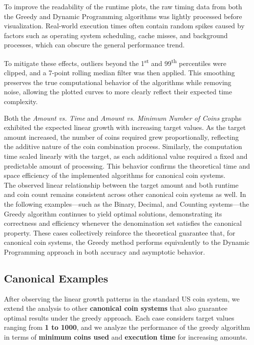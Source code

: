 \documentclass[12pt,a4paper]{report}
\begin{document}
\begin{tcolorbox}[colback=gray!5!white, colframe=black, title=Note on Data Smoothing and Filtering]
To improve the readability of the runtime plots, the raw timing data from both the Greedy and Dynamic Programming algorithms was lightly processed before visualization. Real-world execution times often contain random spikes caused by factors such as operating system scheduling, cache misses, and background processes, which can obscure the general performance trend.  

To mitigate these effects, outliers beyond the 1\textsuperscript{st} and 99\textsuperscript{th} percentiles were clipped, and a 7-point rolling median filter was then applied. This smoothing preserves the true computational behavior of the algorithms while removing noise, allowing the plotted curves to more clearly reflect their expected time complexity.
\end{tcolorbox}

Both the \textit{Amount vs. Time} and \textit{Amount vs. Minimum Number of Coins} graphs exhibited the expected linear growth with increasing target values. As the target amount increased, the number of coins required grew proportionally, reflecting the additive nature of the coin combination process. Similarly, the computation time scaled linearly with the target, as each additional value required a fixed and predictable amount of processing. This behavior confirms the theoretical time and space efficiency of the implemented algorithms for canonical coin systems.\\

The observed linear relationship between the target amount and both runtime and coin count remains consistent across other canonical coin systems as well. In the following examples—such as the Binary, Decimal, and Counting systems—the Greedy algorithm continues to yield optimal solutions, demonstrating its correctness and efficiency whenever the denomination set satisfies the canonical property. These cases collectively reinforce the theoretical guarantee that, for canonical coin systems, the Greedy method performs equivalently to the Dynamic Programming approach in both accuracy and asymptotic behavior.\\

\subsection{Canonical Examples}
After observing the linear growth patterns in the standard US coin system, we extend the analysis to other \textbf{canonical coin systems} that also guarantee optimal results under the greedy approach. Each case considers target values ranging from \textbf{1 to 1000}, and we analyze the performance of the greedy algorithm in terms of \textbf{minimum coins used} and \textbf{execution time} for increasing amounts.\\
\end{document}

